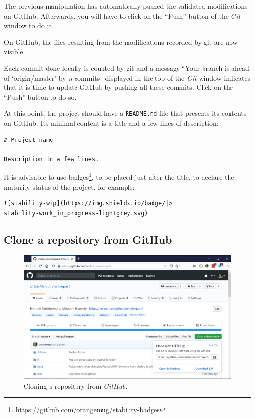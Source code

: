 \documentclass[
  12pt,
  american,
  a4paper,
  extrafontsizes,onecolumn,openright
  ]{memoir}
\begin{document}
The previous manipulation has automatically pushed the validated modifications on GitHub.
Afterwards, you will have to click on the \enquote{Push} button of the \emph{Git} window to do it.

On GitHub, the files resulting from the modifications recorded by git are now visible.

Each commit done locally is counted by git and a message \enquote{Your branch is ahead of \enquote*{origin/master} by \emph{n} commits} displayed in the top of the \emph{Git} window indicates that it is time to update GitHub by pushing all these commits.
Click on the \enquote{Push} button to do so.

At this point, the project should have a \texttt{README.md} file that presents its contents on GitHub.
Its minimal content is a title and a few lines of description:

\begin{verbatim}
# Project name

Description in a few lines.
\end{verbatim}

It is advisable to use badges\footnote{\url{https://github.com/orangemug/stability-badges}}, to be placed just after the title, to declare the maturity status of the project, for example:

\begin{verbatim}
![stability-wip](https://img.shields.io/badge/|>
stability-work_in_progress-lightgrey.svg)
\end{verbatim}

\hypertarget{clone-a-repository-from-github}{%
\subsection{Clone a repository from GitHub}\label{clone-a-repository-from-github}}



\scriptsize

\begin{figure}

{\centering \includegraphics[width=0.8\linewidth]{images/git-Clone} 

}

\caption{Cloning a repository from \emph{GitHub.}}\label{fig:git-Clone}
\end{figure}
\end{document}
